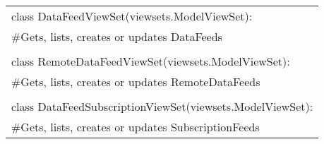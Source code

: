 \documentclass[11pt]{article}
\begin{document}
\begin{center}
\begin{tabular}{|l|}
		class DataFeedViewSet(viewsets.ModelViewSet):\\
		\#Gets, lists, creates or updates DataFeeds\\ \\
		
		class RemoteDataFeedViewSet(viewsets.ModelViewSet):\\
		\#Gets, lists, creates or updates RemoteDataFeeds\\ \\
		
		class DataFeedSubscriptionViewSet(viewsets.ModelViewSet):\\
		\#Gets, lists, creates or updates SubscriptionFeeds\\
		
		\hline
	\end{tabular}
\end{center}
\end{document}
